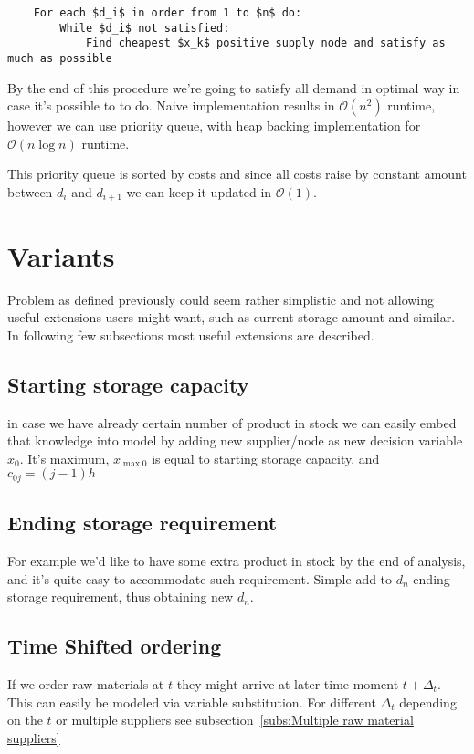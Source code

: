 \begin{verbatim}
    For each $d_i$ in order from 1 to $n$ do:
        While $d_i$ not satisfied:
            Find cheapest $x_k$ positive supply node and satisfy as much as possible
\end{verbatim}

By the end of this procedure we're going to satisfy all demand in optimal way in case it's possible to to do. Naive implementation results in $\mathcal{O}(n^2)$ runtime, however we can use priority queue, with heap backing implementation for $\mathcal{O}(n\log{}n)$ runtime.

This priority queue is sorted by costs and since all costs raise by constant amount between $d_i$ and $d_{i+1}$ we can keep it updated in $\mathcal{O}(1)$.

\section{Variants}
\label{sec:Variants}

Problem as defined previously could seem rather simplistic and not allowing useful extensions users might want, such as current storage amount and similar. In following few subsections most useful extensions are described.

\subsection{Starting storage capacity}
in case we have already certain number of product in stock we can easily embed that knowledge into model by adding new supplier/node as new decision variable $x_0$. It's maximum, $x_{\max0}$ is equal to starting storage capacity, and $c_{0j} = \left( j - 1 \right) h$

\subsection{Ending storage requirement}
\label{subs:Ending storage requirement}
For example we'd like to have some extra product in stock by the end of analysis, and it's quite easy to accommodate such requirement. Simple add to $d_n$ ending storage requirement, thus obtaining new $d_n$.

\subsection{Time Shifted ordering}
\label{subs:Time Shifted ordering}
If we order raw materials at $t$ they might arrive at later time moment $t+\Delta_t$. This can easily be modeled via variable substitution. For different $\Delta_t$ depending on the $t$ or multiple suppliers see subsection~\ref{subs:Multiple raw material suppliers}

